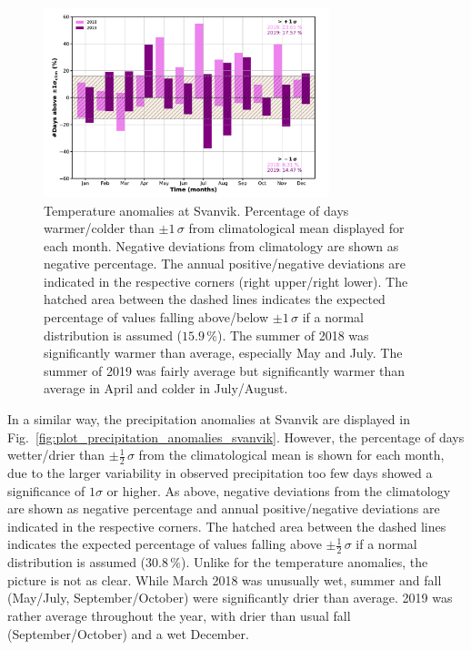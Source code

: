 \documentclass[bg, manuscript]{copernicus}
\begin{document}
\begin{figure}[t]
  \includegraphics[width=8.3cm]{fig08}
  \caption{Temperature anomalies at Svanvik. Percentage of days warmer/colder than $\pm 1\,\sigma$ from climatological mean displayed for each month. Negative deviations from climatology are shown as negative percentage. The annual positive/negative deviations are indicated in the respective corners (right upper/right lower). The hatched area between the dashed lines indicates the expected percentage of values falling above/below $\pm 1\,\sigma$ if a normal distribution is assumed ($15.9\,\unit{\%}$). The summer of 2018 was significantly warmer than average, especially May and July. The summer of 2019 was fairly average but significantly warmer than average in April and colder in July/August.}
  \label{fig:plot_temperature_anomalies_svanvik}
\end{figure}

In a similar way, the precipitation anomalies at Svanvik are displayed in Fig.~\ref{fig:plot_precipitation_anomalies_svanvik}. However, the percentage of days wetter/drier than $\pm \frac{1}{2}\,\sigma$ from the climatological mean is shown for each month, due to the larger variability in observed precipitation too few days showed a significance of $1 \sigma$ or higher. As above, negative deviations from the climatology are shown as negative percentage and annual positive/negative deviations are indicated in the respective corners. The hatched area between the dashed lines indicates the expected percentage of values falling above $\pm\frac{1}{2}\,\sigma$ if a normal distribution is assumed ($30.8\,\unit{\%}$). Unlike for the temperature anomalies, the picture is not as clear. While March 2018 was unusually wet, summer and fall (May/July, September/October) were significantly drier than average. 2019 was rather average throughout the year, with drier than usual fall (September/October) and a wet December.
\end{document}
